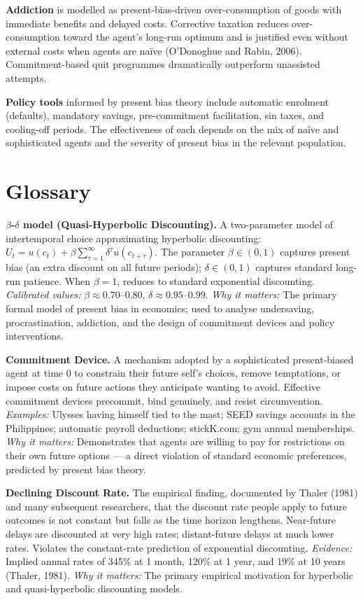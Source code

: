 \documentclass[12pt, letterpaper]{article}
\begin{document}
\textbf{Addiction} is modelled as present-bias-driven over-consumption of goods with immediate benefits and delayed costs. Corrective taxation reduces over-consumption toward the agent's long-run optimum and is justified even without external costs when agents are naïve (O'Donoghue and Rabin, 2006). Commitment-based quit programmes dramatically outperform unassisted attempts.

\textbf{Policy tools} informed by present bias theory include automatic enrolment (defaults), mandatory savings, pre-commitment facilitation, sin taxes, and cooling-off periods. The effectiveness of each depends on the mix of naïve and sophisticated agents and the severity of present bias in the relevant population.

\medskip


\section*{Glossary}


\textbf{$\beta$-$\delta$ model (Quasi-Hyperbolic Discounting).} A two-parameter model of intertemporal choice approximating hyperbolic discounting: $U_t = u(c_t) + \beta \sum_{\tau=1}^{\infty} \delta^\tau u(c_{t+\tau})$. The parameter $\beta \in (0,1)$ captures present bias (an extra discount on all future periods); $\delta \in (0,1)$ captures standard long-run patience. When $\beta=1$, reduces to standard exponential discounting. \textit{Calibrated values:} $\beta \approx 0.70$--0.80, $\delta \approx 0.95$--0.99. \textit{Why it matters:} The primary formal model of present bias in economics; used to analyse undersaving, procrastination, addiction, and the design of commitment devices and policy interventions.

\textbf{Commitment Device.} A mechanism adopted by a sophisticated present-biased agent at time 0 to constrain their future self's choices, remove temptations, or impose costs on future actions they anticipate wanting to avoid. Effective commitment devices precommit, bind genuinely, and resist circumvention. \textit{Examples:} Ulysses having himself tied to the mast; SEED savings accounts in the Philippines; automatic payroll deductions; stickK.com; gym annual memberships. \textit{Why it matters:} Demonstrates that agents are willing to pay for restrictions on their own future options --- a direct violation of standard economic preferences, predicted by present bias theory.

\textbf{Declining Discount Rate.} The empirical finding, documented by Thaler (1981) and many subsequent researchers, that the discount rate people apply to future outcomes is not constant but falls as the time horizon lengthens. Near-future delays are discounted at very high rates; distant-future delays at much lower rates. Violates the constant-rate prediction of exponential discounting. \textit{Evidence:} Implied annual rates of 345\% at 1 month, 120\% at 1 year, and 19\% at 10 years (Thaler, 1981). \textit{Why it matters:} The primary empirical motivation for hyperbolic and quasi-hyperbolic discounting models.
\end{document}
